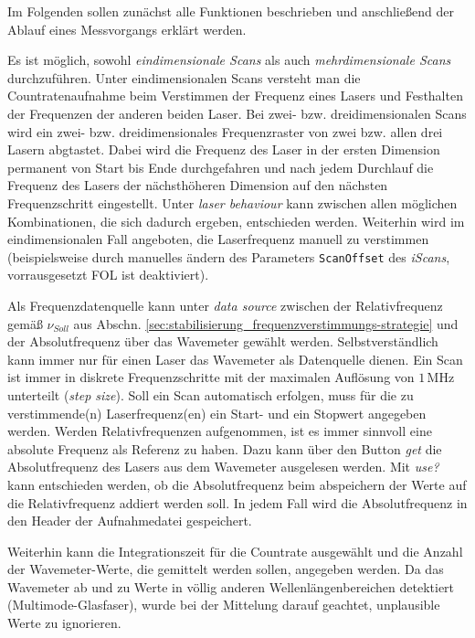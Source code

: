 Im Folgenden sollen zunächst alle Funktionen beschrieben und
anschließend der Ablauf eines Messvorgangs erklärt werden.\par
Es ist möglich, sowohl \textit{eindimensionale Scans} als auch
\textit{mehrdimensionale Scans} durchzuführen. Unter eindimensionalen Scans
versteht man die Countratenaufnahme beim Verstimmen der Frequenz eines Lasers
und Festhalten der Frequenzen der anderen beiden Laser. Bei zwei- bzw.
dreidimensionalen Scans wird ein zwei- bzw. dreidimensionales Frequenzraster von
zwei bzw. allen drei Lasern abgtastet. Dabei wird die Frequenz des Laser in der
ersten Dimension permanent von Start bis Ende durchgefahren und nach jedem
Durchlauf die Frequenz des Lasers der nächsthöheren Dimension auf den nächsten
Frequenzschritt eingestellt. Unter \textit{laser behaviour} kann zwischen
allen möglichen Kombinationen, die sich dadurch ergeben, entschieden werden.
Weiterhin wird im eindimensionalen Fall angeboten, die Laserfrequenz manuell zu
verstimmen (beispielsweise durch manuelles
ändern des Parameters \lstinline|ScanOffset| des \textit{iScans}, 
vorrausgesetzt FOL ist deaktiviert).\par
Als Frequenzdatenquelle kann unter \textit{data
source} zwischen der Relativfrequenz gemäß
$\nu_{Soll}$ aus Abschn. \ref{sec:stabilisierung_frequenzverstimmungs-strategie}
und der Absolutfrequenz über das Wavemeter gewählt werden. Selbstverständlich
kann immer nur für einen Laser das Wavemeter als Datenquelle dienen. Ein Scan ist immer in
diskrete Frequenzschritte mit der maximalen Auflösung von $1\,$MHz unterteilt
(\textit{step size}). Soll ein Scan automatisch erfolgen, muss für die zu
verstimmende(n) Laserfrequenz(en) ein Start- und ein Stopwert angegeben werden.
Werden Relativfrequenzen aufgenommen, ist es immer sinnvoll eine absolute
Frequenz als Referenz zu haben. Dazu kann über den Button \textit{get} die
Absolutfrequenz des Lasers aus dem Wavemeter ausgelesen werden. Mit
\textit{use?} kann entschieden werden, ob die Absolutfrequenz beim abspeichern
der Werte auf die Relativfrequenz addiert werden soll. In jedem Fall wird die
Absolutfrequenz in den Header der Aufnahmedatei gespeichert.\par
Weiterhin kann die Integrationszeit für die Countrate ausgewählt und die Anzahl
der Wavemeter-Werte, die gemittelt werden sollen, angegeben werden. Da das
Wavemeter ab und zu Werte in völlig anderen Wellenlängenbereichen detektiert
(Multimode-Glasfaser), wurde bei der Mittelung darauf geachtet,
unplausible Werte zu ignorieren.\par
